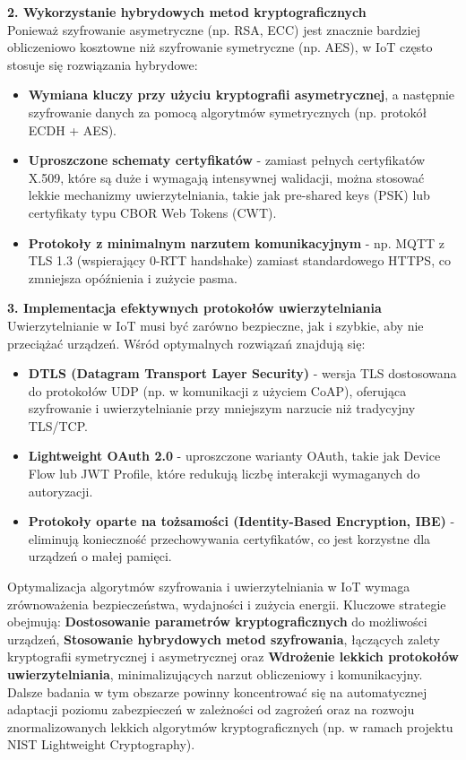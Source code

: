 \textbf{2. Wykorzystanie hybrydowych metod kryptograficznych} \\
Ponieważ szyfrowanie asymetryczne (np. RSA, ECC) jest znacznie bardziej obliczeniowo kosztowne niż szyfrowanie symetryczne (np. AES), w IoT często stosuje się rozwiązania hybrydowe:
\begin{itemize}
    \item \textbf{Wymiana kluczy przy użyciu kryptografii asymetrycznej}, a następnie szyfrowanie danych za pomocą algorytmów symetrycznych (np. protokół ECDH + AES).
    \item \textbf{Uproszczone schematy certyfikatów} - zamiast pełnych certyfikatów X.509, które są duże i wymagają intensywnej walidacji, można stosować lekkie mechanizmy uwierzytelniania, takie jak pre-shared keys (PSK) lub certyfikaty typu CBOR Web Tokens (CWT).
    \item \textbf{Protokoły z minimalnym narzutem komunikacyjnym} - np. MQTT z TLS 1.3 (wspierający 0-RTT handshake) zamiast standardowego HTTPS, co zmniejsza opóźnienia i zużycie pasma.
\end{itemize}

\textbf{3. Implementacja efektywnych protokołów uwierzytelniania} \\
Uwierzytelnianie w IoT musi być zarówno bezpieczne, jak i szybkie, aby nie przeciążać urządzeń. Wśród optymalnych rozwiązań znajdują się:
\begin{itemize}
    \item \textbf{DTLS (Datagram Transport Layer Security)} - wersja TLS dostosowana do protokołów UDP (np. w komunikacji z użyciem CoAP), oferująca szyfrowanie i uwierzytelnianie przy mniejszym narzucie niż tradycyjny TLS/TCP.
    \item \textbf{Lightweight OAuth 2.0} - uproszczone warianty OAuth, takie jak Device Flow lub JWT Profile, które redukują liczbę interakcji wymaganych do autoryzacji.
    \item \textbf{Protokoły oparte na tożsamości (Identity-Based Encryption, IBE)} - eliminują konieczność przechowywania certyfikatów, co jest korzystne dla urządzeń o małej pamięci.
\end{itemize}

Optymalizacja algorytmów szyfrowania i uwierzytelniania w IoT wymaga zrównoważenia bezpieczeństwa, wydajności i zużycia energii. Kluczowe strategie obejmują: \textbf{Dostosowanie parametrów kryptograficznych} do możliwości urządzeń, \textbf{Stosowanie hybrydowych metod szyfrowania}, łączących zalety kryptografii symetrycznej i asymetrycznej oraz \textbf{Wdrożenie lekkich protokołów uwierzytelniania}, minimalizujących narzut obliczeniowy i komunikacyjny. 
Dalsze badania w tym obszarze powinny koncentrować się na automatycznej adaptacji poziomu zabezpieczeń w zależności od zagrożeń oraz na rozwoju znormalizowanych lekkich algorytmów kryptograficznych (np. w ramach projektu NIST Lightweight Cryptography).

